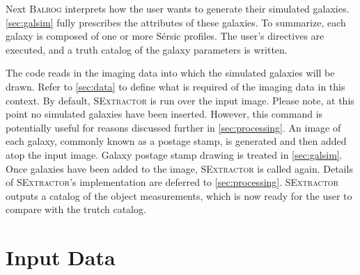 \documentclass[12pt]{book}
\newcommand{\balrog}{\textsc{Balrog}}
\newcommand{\sex}{\textsc{SExtractor}}
\newcommand{\sersic}{S\'{e}rsic}
\begin{document}
Next \balrog{} interprets how the user wants to generate their simulated galaxies.
\autoref{sec:galsim} fully prescribes the attributes of these galaxies.
To summarize, each galaxy is composed of one or more \sersic{} profiles.
The user's directives are executed, and  a truth catalog of the galaxy parameters is written.

The code reads in the imaging data into which the simulated galaxies will be drawn.
Refer to \autoref{sec:data} to define what is required of the imaging data in this context.
By default, \sex{} is run over the input image. Please note, at this point no simulated
galaxies have been inserted. However, this command is potentially useful
for reasons discussed further in \autoref{sec:processing}.
An image of each galaxy, commonly known as a postage stamp, is generated and then added atop the input image.
Galaxy postage stamp drawing is treated in \autoref{sec:galsim}.
Once galaxies have been added to the image, \sex{} is called again.
Details of \sex{}'s implementation are deferred to \autoref{sec:processing}.
\sex{} outputs a catalog of the object measurements, which is now ready
for the user to compare with the trutch catalog.


\section{Input Data}
\label{sec:data}
\end{document}
